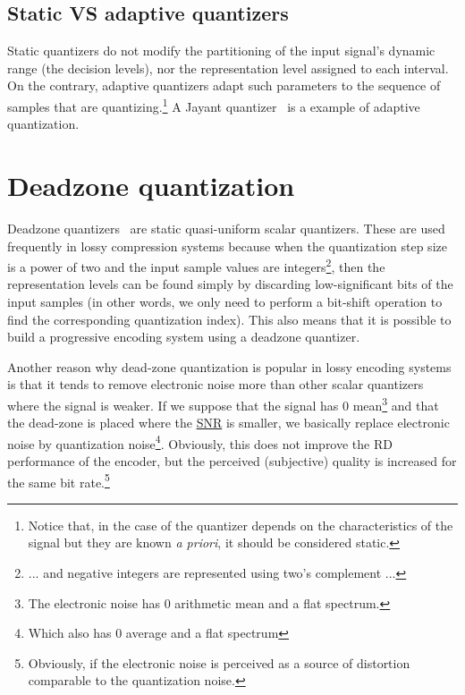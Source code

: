 
\subsection{Static VS adaptive quantizers}

Static quantizers do not modify the partitioning of the input signal's
dynamic range (the decision levels), nor the representation level
assigned to each interval. On the contrary, adaptive quantizers adapt
such parameters to the sequence of samples that are
quantizing.\footnote{Notice that, in the case of the quantizer depends
  on the characteristics of the signal but they are known \emph{a
    priori}, it should be considered static.} A Jayant
quantizer~\cite{vruiz__scalar_quantization} is a example of adaptive
quantization.



\section{Deadzone quantization}

Deadzone quantizers~\cite{vruiz__scalar_quantization} are static
quasi-uniform scalar quantizers. These are used frequently in lossy
compression systems because when the quantization step size is a power
of two and the input sample values are integers\footnote{... and negative
integers are represented using two's complement ...}, then the
representation levels can be found simply by discarding
low-significant bits of the input samples (in other words, we only
need to perform a bit-shift operation to find the corresponding
quantization index). This also means that it is possible to build a
progressive encoding system using a deadzone quantizer.

Another reason why dead-zone quantization is popular in lossy encoding
systems is that it tends to remove electronic noise more than other
scalar quantizers where the signal is weaker. If we suppose that the
signal has 0 mean\footnote{The electronic noise has 0 arithmetic mean
  and a flat spectrum.} and that the dead-zone is placed where the
\href{https://en.wikipedia.org/wiki/Signal-to-noise_ratio}{SNR} is
smaller, we basically replace electronic noise by quantization
noise\footnote{Which also has 0 average and a flat
  spectrum}. Obviously, this does not improve the RD performance of
the encoder, but the perceived (subjective) quality is increased for
the same bit rate.\footnote{Obviously, if the electronic noise is
  perceived as a source of distortion comparable to the quantization
  noise.}

